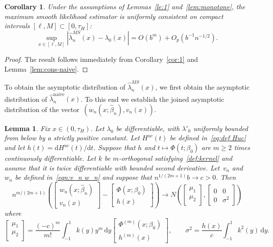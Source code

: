 \documentclass[11pt,reqno]{amsart}
\theoremstyle{definition}
\theoremstyle{plain}
\newtheorem{lemma}[de]{Lemma}
\newtheorem{cor}[de]{Corollary}
\theoremstyle{remark}
\begin{document}
\begin{cor}
\label{cor:cons-MS}
Under the assumptions of Lemmas~\ref{le:1} and~\ref{lem:monotone},
the maximum smooth likelihood estimator is uniformly consistent on compact intervals $[\ell,M]\subset [0,\tau_H]$:
\[
\sup_{x\in[\ell,M]}\left|\hat{\lambda}^{MS}_n(x)-\lambda_0(x)\right|
=
O(b^{m})+O_p(b^{-1}n^{-1/2}).
\]
\end{cor}
\begin{proof}
The result follows immediately from Corollary~\ref{cor:1} and Lemma~\ref{lem:cons-naive}.
\end{proof}
To obtain the asymptotic distribution of $\hat{\lambda}^{MS}_n(x)$, we first obtain the asymptotic distribution of $\hat{\lambda}_n^{\mathrm{naive}}(x)$.
To this end we establish the joined asymptotic distribution of the vector~$(w_n(x;\hat\beta_n),v_n(x))$.
\begin{lemma}
\label{lemma:distr}
Fix $x\in(0,\tau_H)$.
Let $\lambda_0$ be differentiable, with $\lambda'_0$ uniformly bounded from below by a strictly positive constant.
Let $H^{uc}(t)$ be defined in~\eqref{eq:def Huc} and let $h(t)=\mathrm{d}H^{uc}(t)/\mathrm{d}t$.
Suppose that $h$ and $t\mapsto\Phi(t;\beta_0)$ are $m\geq 2$ times continuously differentiable.
Let $k$ be $m$-orthogonal satisfying~\eqref{def:kernel} and assume that it is twice differentiable with bounded second derivative.
Let~$v_n$ and~$w_n$ be defined in~\eqref{eqn:v_n w_n} and suppose that $n^{1/(2m+1)}b\to c>0$.
Then
\[
n^{m/(2m+1)}
\left(
\begin{bmatrix}
w_n(x;\hat\beta_n)\\
v_n(x)
\end{bmatrix}
-
\begin{bmatrix}
\Phi(x;\beta_0)\\
h(x)
\end{bmatrix}
\right)
\to
N\left(\begin{bmatrix}
             \mu_1 \\
             \mu_2 \\
           \end{bmatrix},\begin{bmatrix}
0 & 0\\
0 & \sigma^2
\end{bmatrix}\right)
\]
where
\[
\begin{bmatrix}
             \mu_1 \\
             \mu_2 \\
           \end{bmatrix}
=
\frac{(-c)^m}{m!}\int_{-1}^1 k(y)y^m\,\mathrm{d}y
\begin{bmatrix}
\Phi^{(m)}(x;\beta_0)\\
h^{(m)}(x)
\end{bmatrix},
\qquad
\sigma^2=\frac{h(x)}c
\int_{-1}^1 k^2(y)\,\mathrm{d}y.
\]
\end{lemma}
\end{document}
